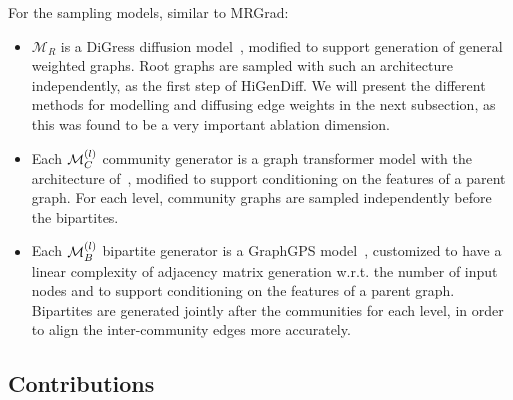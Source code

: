 For the sampling models, similar to MRGrad:
\begin{itemize}
    \item $\mathcal{M}_R$ is a DiGress diffusion model~\cite{vignac_digress_2022}, modified to support generation of general weighted graphs. Root graphs are sampled with such an architecture independently, as the first step of HiGenDiff. We will present the different methods for modelling and diffusing edge weights in the next subsection, as this was found to be a very important ablation dimension. 
    \item Each $\mathcal{M}^{\mathopen{}\left(l\right)}_C$ community generator is a graph transformer model with the architecture of~\cite{dwivedi_generalization_2021}, modified to support conditioning on the features of a parent graph. For each level, community graphs are sampled independently before the bipartites.
    \item Each $\mathcal{M}^{\mathopen{}\left(l\right)}_B$ bipartite generator is a GraphGPS model~\cite{rampasek_recipe_2022}, customized to have a linear complexity of adjacency matrix generation w.r.t. the number of input nodes and to support conditioning on the features of a parent graph. Bipartites are generated jointly after the communities for each level, in order to align the inter-community edges more accurately.
\end{itemize}

\subsection{Contributions}


